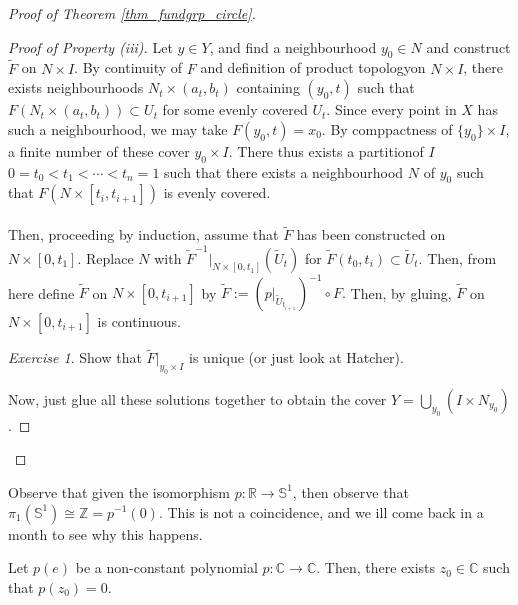 \documentclass[a4paper]{report}
\theoremstyle{definition}
\theoremstyle{remark}
\theoremstyle{proposition}
\theoremstyle{conjecture}
\theoremstyle{lemma}
\theoremstyle{corollary}
\theoremstyle{exercise}
\newtheorem{exercise}{Exercise}
\newcommand{\C}{\mathbb{C}}
\begin{document}
\begin{proof}[Proof of Theorem \ref{thm_fundgrp_circle}]
\begin{proof}[Proof of Property (iii)]
    Let $y \in Y$, and
    find a neighbourhood $y_0 \in N$ and construct $\widetilde{F}$ on $N\times I$. By continuity of $F$ and definition of product topologyon $N\times I$, there exists neighbourhoods
    $N_t \times (a_t,b_t)$ containing $(y_0,t)$
    such that $F(N_t \times (a_t,b_t)) \subset U_t$ for some evenly covered $U_t$. Since every point in $X$ has such a neighbourhood, we may take $F(y_0,t) = x_0$. By comppactness of $\lbrace y_0 \rbrace \times I$, a finite number of these cover $y_0 \times I$. There thus exists a partitionof $I$ $0 = t_0 < t_1 < \cdots < t_n = 1$ such that there exists a neighbourhood $N$ of $y_0$ such that $F(N\times [t_i,t_{i+1}])$ is evenly covered.\\\\
    Then, proceeding by induction, assume that $\widetilde{F}$ has been constructed on $N \times [0,t_1]$. Replace $N$ with $\widetilde{F}^{-1}\vert_{N \times [0,t_1]}(\widetilde{U}_t)$ for $\widetilde{F}(t_0,t_i) \subset \widetilde{U}_t$. Then, from here define $\widetilde{F}$ on $N \times [0,t_{i+1}]$ by $\widetilde{F} := (p\vert_{\widetilde{U}_{t_{i+1}}})^{-1} \circ F.$ Then, by gluing, $\widetilde{F}$ on $N \times [0,t_{i+1}]$ is continuous.
\begin{exercise}
    Show that $\widetilde{F}\vert_{y_0 \times I}$ is unique (or just look at Hatcher).
\end{exercise}
Now, just glue all these solutions together to obtain the cover 
$Y = \bigcup_{y_0}(I \times N_{y_0})$.
\end{proof}
\end{proof}

Observe that 
given the isomorphism $p : \mathbb{R} \to \mathbb{S}^1$, then observe that $\pi_1(\mathbb{S}^1) \cong \mathbb{Z} = p^{-1}(0)$. This is not a coincidence, and we ill come back in a month to see why this happens.

\begin{theorem}
    Let $p(e)$ be a non-constant polynomial $p : \C \to \C$. Then, there exists $z_0 \in \C$ such that $p(z_0) = 0$.
\end{theorem}
\end{document}
